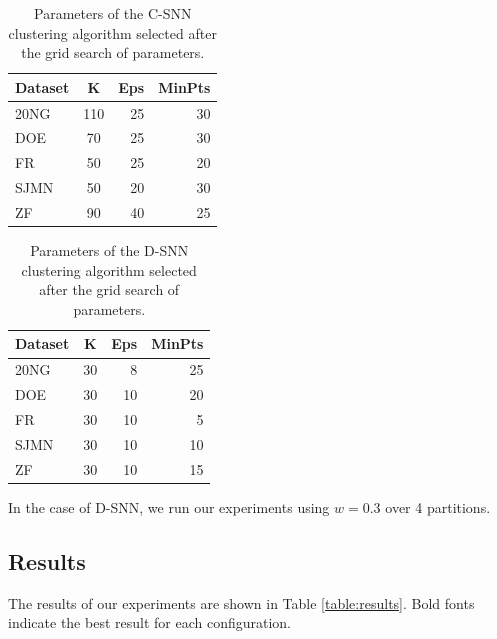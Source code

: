\documentclass[preprint,12pt,authoryear,review]{elsarticle}
\begin{document}
\begin{table}[!htbp]
\centering
\begin{tabular}{l|crr}
\textbf{Dataset} & \textbf{K} & \textbf{Eps} & \textbf{MinPts} \\ \hline
20NG    & 110& 25 & 30 \\
DOE     &  70& 25 & 30 \\
FR      &  50& 25 & 20  \\
SJMN    &  50& 20 & 30 \\
ZF      &  90& 40 & 25 \\ \hline
\end{tabular}
\caption{Parameters of the C-SNN clustering algorithm selected after the grid search of parameters.}
\label{table:centralizedsnn_params}
\end{table}

\begin{table}[!htbp]
\centering
\begin{tabular}{l|crr}
\textbf{Dataset} & \textbf{K} & \textbf{Eps} & \textbf{MinPts} \\ \hline
20NG    & 30& 8 & 25 \\
DOE     & 30& 10& 20 \\
FR      & 30& 10& 5  \\
SJMN    & 30& 10& 10 \\
ZF      & 30& 10& 15 \\ \hline
\end{tabular}
\caption{Parameters of the D-SNN clustering algorithm selected after the grid search of parameters.}
\label{table:distributedsnn_params}
\end{table}

In the case of D-SNN, we run our experiments using $w = 0.3$ over 4 partitions. 

\subsection*{Results} %

The results of our experiments are shown in Table \ref{table:results}. 
Bold fonts indicate the best result for each configuration. 
\end{document}
